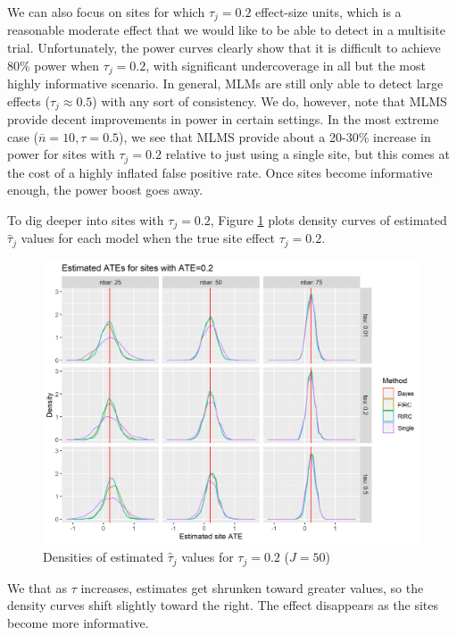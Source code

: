 \documentclass[]{article}
\begin{document}
We can also focus on sites for which $\tau_j = 0.2$ effect-size units, which is a reasonable moderate effect that we would like to be able to detect in a multisite trial.
Unfortunately, the power curves clearly show that it is difficult to achieve 80\% power when $\tau_j = 0.2$, with significant undercoverage in all but the most highly informative scenario.
In general, MLMs are still only able to detect large effects ($\tau_j \approx 0.5$) with any sort of consistency.
We do, however, note that MLMS provide decent improvements in power in certain settings.
In the most extreme case ($\bar{n} = 10, \tau = 0.5$), we see that MLMS provide about a 20-30\% increase in power for sites with $\tau_j = 0.2$ relative to just using a single site, but this comes at the cost of a highly inflated false positive rate.
Once sites become informative enough, the power boost goes away.

To dig deeper into sites with $\tau_j = 0.2$, Figure \ref{fig:power_plot_ATE02_dens} plots density curves of estimated $\hat{\tau}_j$ values for each model when the true site effect $\tau_j = 0.2$.

\begin{figure}[ht]
	\centering
	\includegraphics[width=\textwidth]{power_plot_ATE02_dens}
	\caption{Densities of estimated $\hat{\tau}_j$ values for $\tau_j = 0.2$ ($J = 50$)}
	\label{fig:power_plot_ATE02_dens}
\end{figure}

We that as $\tau$ increases, estimates get shrunken toward greater values, so the density curves shift slightly toward the right.
The effect disappears as the sites become more informative.
\end{document}
